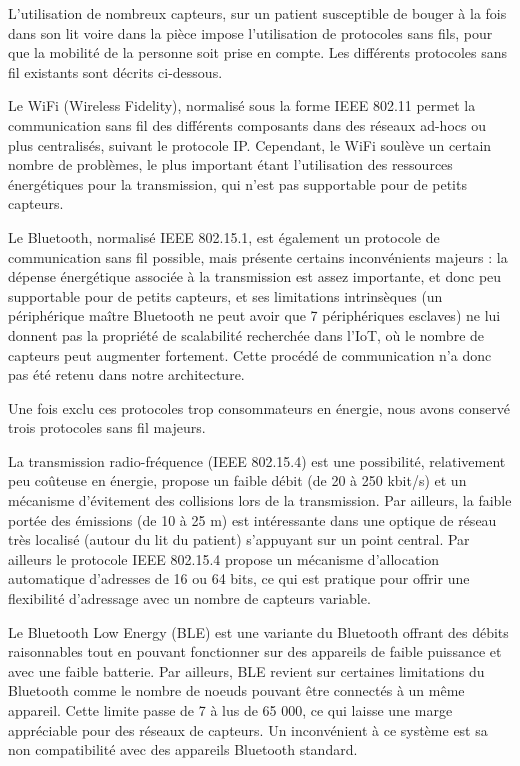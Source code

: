 \documentclass{article}
\begin{document}
L’utilisation de nombreux capteurs, sur un patient susceptible de bouger à la fois dans son lit voire dans la pièce impose l’utilisation de protocoles sans fils, pour que la mobilité de la personne soit prise en compte. Les différents protocoles sans fil existants sont décrits ci-dessous.

Le WiFi (Wireless Fidelity), normalisé sous la forme IEEE 802.11 permet la communication sans fil des différents composants dans des réseaux ad-hocs ou plus centralisés, suivant le protocole IP. Cependant, le WiFi soulève un certain nombre de problèmes, le plus important étant l'utilisation des ressources énergétiques pour la transmission, qui n’est pas supportable pour de petits capteurs.

Le Bluetooth, normalisé IEEE 802.15.1, est également un protocole de communication sans fil possible, mais présente certains inconvénients majeurs : la dépense énergétique associée à la transmission est assez importante, et donc peu supportable pour de petits capteurs, et ses limitations intrinsèques (un périphérique maître Bluetooth ne peut avoir que 7 périphériques esclaves) ne lui donnent pas la propriété de scalabilité recherchée dans l'IoT, où le nombre de capteurs peut augmenter fortement. Cette procédé de communication n'a donc pas été retenu dans notre architecture.

Une fois exclu ces protocoles trop consommateurs en énergie, nous avons conservé trois protocoles sans fil majeurs.

La transmission radio-fréquence (IEEE 802.15.4) est une possibilité, relativement peu coûteuse en énergie, propose un faible débit (de 20 à 250 kbit/s) et un mécanisme d’évitement des collisions lors de la transmission. Par ailleurs, la faible portée des émissions (de 10 à 25 m) est intéressante dans une optique de réseau très localisé (autour du lit du patient) s’appuyant sur un point central. Par ailleurs le protocole IEEE 802.15.4 propose un mécanisme d’allocation automatique d’adresses de 16 ou 64 bits, ce qui est pratique pour offrir une flexibilité d’adressage avec un nombre de capteurs variable.

Le Bluetooth Low Energy (BLE) est une variante du Bluetooth offrant des débits raisonnables tout en pouvant fonctionner sur des appareils de faible puissance et avec une faible batterie. Par ailleurs, BLE revient sur certaines limitations du Bluetooth comme le nombre de noeuds pouvant être connectés à un même appareil. Cette limite passe de 7 à lus de 65 000, ce qui laisse une marge appréciable pour des réseaux de capteurs. Un inconvénient à ce système est sa non compatibilité avec des appareils Bluetooth standard.
\end{document}
